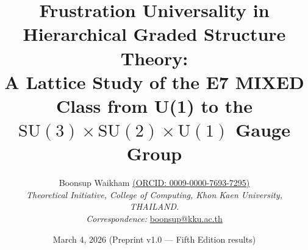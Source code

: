 \documentclass[12pt,a4paper]{article}
\theoremstyle{plain}
\theoremstyle{definition}
\theoremstyle{remark}
\begin{document}

\title{%
  \textbf{Frustration Universality in Hierarchical Graded Structure Theory:\\ 
  A Lattice Study of the E7 MIXED Class from U(1) to the $\mathrm{SU}(3){\times}\mathrm{SU}(2){\times}\mathrm{U}(1)$ Gauge Group}
}

\author{%
  Boonsup Waikham \href{https://orcid.org/0009-0000-7693-7295}{\small(ORCID: 0009-0000-7693-7295)}\\[4pt]
  \small\textit{Theoretical Initiative, College of Computing, Khon Kaen University, THAILAND.}\\
  \small\textit{Correspondence:} \href{mailto:boonsup@kku.ac.th}{boonsup@kku.ac.th}
}

\date{March 4, 2026 \quad
      {\normalsize(Preprint v1.0 --- Fifth Edition results)}}

\maketitle
\thispagestyle{empty}
\end{document}
